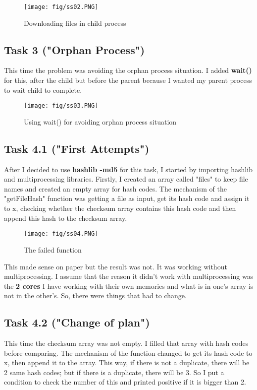 \documentclass[onecolumn]{article}
\begin{document}
\begin{figure}[H]
\centering
\texttt{[image: fig/ss02.PNG]}
\caption{Downloading files in child process}
\end{figure}

\subsection{Task 3 ("Orphan Process")}
This time the problem was avoiding the orphan process situation. I added \textbf{wait()} for this, after the child but before the parent because I wanted my parent process to wait child to complete. 

\begin{figure}[H]
\centering
\texttt{[image: fig/ss03.PNG]}
\caption{Using wait() for avoiding orphan process situation}
\end{figure}

\subsection{Task 4.1 ("First Attempts")}
After I decided to use \textbf{hashlib -md5} for this task, I started by importing hashlib and multiprocessing libraries. Firstly, I created an array called "files" to keep file names and created an empty array for hash codes. The mechanism of the "getFileHash" function was getting a file as input, get its hash code and assign it to x, checking whether the checksum array contains this hash code and then append this hash to the checksum array.

\begin{figure}[H]
\centering
\texttt{[image: fig/ss04.PNG]}
\caption{The failed function}
\end{figure}

This made sense on paper but the result was not. It was working without multiprocessing. I assume that the reason it didn't work with multiprocessing was the\textbf{ 2 cores} I have working with their own memories and what is in one's array is not in the other's. So, there were things that had to change.

\subsection{Task 4.2 ("Change of plan")}
This time the checksum array was not empty. I filled that array with hash codes before comparing. The mechanism of the function changed to get its hash code to x, then append it to the array. This way, if there is not a duplicate, there will be 2 same hash codes; but if there is a duplicate, there will be 3. So I put a condition to check the number of this and printed positive if it is bigger than 2.
\end{document}

